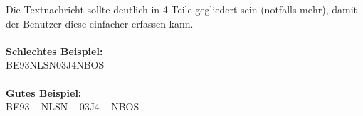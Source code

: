 
Die Textnachricht sollte deutlich in 4 Teile gegliedert sein (notfalls mehr), 
damit der Benutzer diese einfacher erfassen kann.\\\\
\textbf{Schlechtes Beispiel:}\\
BE93NLSN03J4NBOS
\\\\
\textbf{Gutes Beispiel:}\\
BE93 -- NLSN -- 03J4 -- NBOS